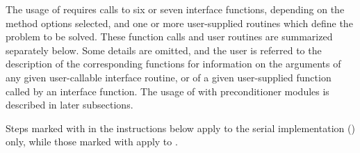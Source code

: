 The usage of {\fcvode} requires calls to six or seven interface
functions, depending on the method options selected, and one or more
user-supplied routines which define the problem to be solved.  These
function calls and user routines are summarized separately below.
Some details are omitted, and the user is referred to the description
of the corresponding {\cvode} functions for information on the arguments 
of any given user-callable interface routine, or of a given user-supplied 
function called by an interface function.
The usage of {\fcvode} with preconditioner modules is described in later
subsections.

Steps marked with {\s} in the instructions below apply to the serial
{\nvector} implementation ({\nvecs}) only, while those marked with {\p}
apply to {\nvecp}.

